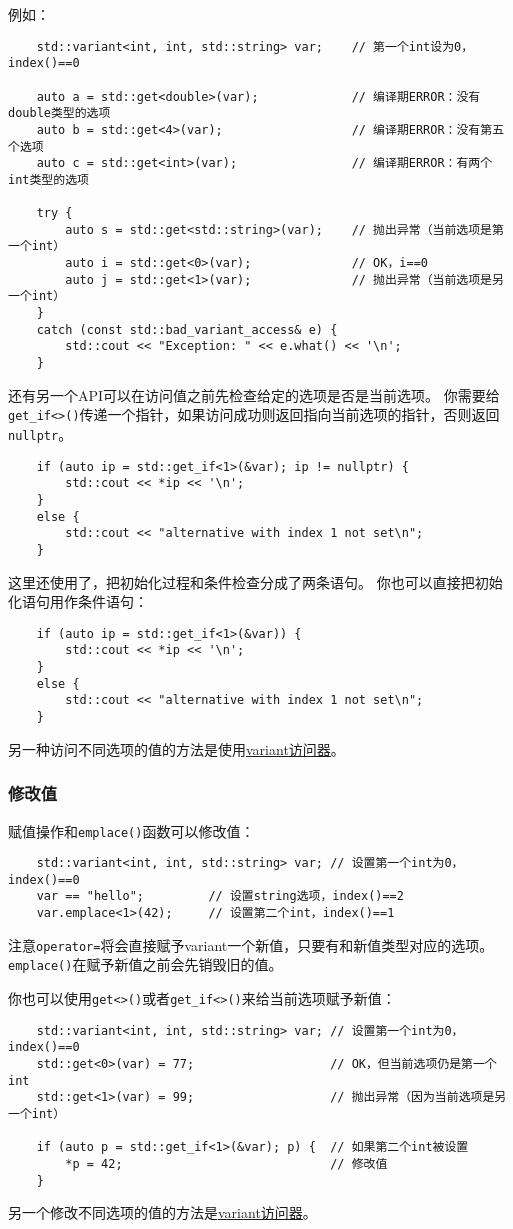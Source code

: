 例如：
\begin{lstlisting}
    std::variant<int, int, std::string> var;    // 第一个int设为0，index()==0

    auto a = std::get<double>(var);             // 编译期ERROR：没有double类型的选项
    auto b = std::get<4>(var);                  // 编译期ERROR：没有第五个选项
    auto c = std::get<int>(var);                // 编译期ERROR：有两个int类型的选项

    try {
        auto s = std::get<std::string>(var);    // 抛出异常（当前选项是第一个int）
        auto i = std::get<0>(var);              // OK，i==0
        auto j = std::get<1>(var);              // 抛出异常（当前选项是另一个int）
    }
    catch (const std::bad_variant_access& e) {
        std::cout << "Exception: " << e.what() << '\n';
    }
\end{lstlisting}
还有另一个API可以在访问值之前先检查给定的选项是否是当前选项。
你需要给\texttt{get\_if<>()}传递一个指针，如果访问成功则返回指向当前选项的指针，否则返回\texttt{nullptr}。
\begin{lstlisting}
    if (auto ip = std::get_if<1>(&var); ip != nullptr) {
        std::cout << *ip << '\n';
    }
    else {
        std::cout << "alternative with index 1 not set\n";
    }
\end{lstlisting}
这里还使用了，把初始化过程和条件检查分成了两条语句。
你也可以直接把初始化语句用作条件语句：
\begin{lstlisting}
    if (auto ip = std::get_if<1>(&var)) {
        std::cout << *ip << '\n';
    }
    else {
        std::cout << "alternative with index 1 not set\n";
    }
\end{lstlisting}
另一种访问不同选项的值的方法是使用\hyperref[ch16.3.3]{variant访问器}。

\subsubsection{修改值}
赋值操作和\texttt{emplace()}函数可以修改值：
\begin{lstlisting}
    std::variant<int, int, std::string> var; // 设置第一个int为0，index()==0
    var == "hello";         // 设置string选项，index()==2
    var.emplace<1>(42);     // 设置第二个int，index()==1
\end{lstlisting}
注意\texttt{operator=}将会直接赋予variant一个新值，只要有和新值类型对应的选项。
\texttt{emplace()}在赋予新值之前会先销毁旧的值。

你也可以使用\texttt{get<>()}或者\texttt{get\_if<>()}来给当前选项赋予新值：
\begin{lstlisting}
    std::variant<int, int, std::string> var; // 设置第一个int为0，index()==0
    std::get<0>(var) = 77;                   // OK，但当前选项仍是第一个int
    std::get<1>(var) = 99;                   // 抛出异常（因为当前选项是另一个int）

    if (auto p = std::get_if<1>(&var); p) {  // 如果第二个int被设置
        *p = 42;                             // 修改值
    }
\end{lstlisting}
另一个修改不同选项的值的方法是\hyperref[ch16.3.3]{variant访问器}。

